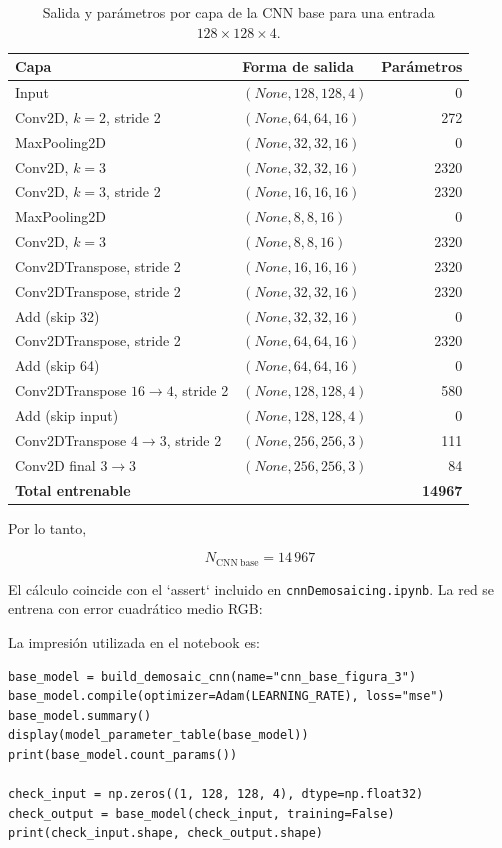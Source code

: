 \documentclass[11pt,a4paper]{article}
\begin{document}
\begin{table}[H]
\centering
\caption{Salida y parámetros por capa de la CNN base para una entrada $128\times128\times4$.}
\label{tab:cnn-layers}
\scriptsize
\begin{tabular}{p{4.2cm}p{4.4cm}r}
\toprule
Capa & Forma de salida & Parámetros\\
\midrule
Input & $(None,128,128,4)$ & 0\\
Conv2D, $k=2$, stride 2 & $(None,64,64,16)$ & 272\\
MaxPooling2D & $(None,32,32,16)$ & 0\\
Conv2D, $k=3$ & $(None,32,32,16)$ & 2320\\
Conv2D, $k=3$, stride 2 & $(None,16,16,16)$ & 2320\\
MaxPooling2D & $(None,8,8,16)$ & 0\\
Conv2D, $k=3$ & $(None,8,8,16)$ & 2320\\
Conv2DTranspose, stride 2 & $(None,16,16,16)$ & 2320\\
Conv2DTranspose, stride 2 & $(None,32,32,16)$ & 2320\\
Add (skip 32) & $(None,32,32,16)$ & 0\\
Conv2DTranspose, stride 2 & $(None,64,64,16)$ & 2320\\
Add (skip 64) & $(None,64,64,16)$ & 0\\
Conv2DTranspose $16\to4$, stride 2 & $(None,128,128,4)$ & 580\\
Add (skip input) & $(None,128,128,4)$ & 0\\
Conv2DTranspose $4\to3$, stride 2 & $(None,256,256,3)$ & 111\\
Conv2D final $3\to3$ & $(None,256,256,3)$ & 84\\
\midrule
\textbf{Total entrenable} & & \textbf{14967}\\
\bottomrule
\end{tabular}
\end{table}

Por lo tanto,

\begin{equation}
    N_{\mathrm{CNN\ base}}=14\,967
    \label{eq:cnn-params}
\end{equation}

El cálculo coincide con el `assert` incluido en \texttt{cnnDemosaicing.ipynb}. La red se entrena con error cuadrático medio RGB:

La impresión utilizada en el notebook es:

\begin{lstlisting}[caption={Verificación de la arquitectura y del número de parámetros.},label={lst:cnn-summary}]
base_model = build_demosaic_cnn(name="cnn_base_figura_3")
base_model.compile(optimizer=Adam(LEARNING_RATE), loss="mse")
base_model.summary()
display(model_parameter_table(base_model))
print(base_model.count_params())

check_input = np.zeros((1, 128, 128, 4), dtype=np.float32)
check_output = base_model(check_input, training=False)
print(check_input.shape, check_output.shape)
\end{lstlisting}
\end{document}
